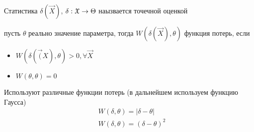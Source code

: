 \documentclass[main.tex]{subfiles}
\begin{document}
\begin{definition}
	Статистика $\delta ( \vec{X} )$, $\delta : \mathfrak{X} \rightarrow \Theta$ наызвается точечной оценкой
\end{definition}

\begin{definition}
	пусть $\theta$ реально значение параметра, тогда $W(\delta (\vec{X}),\theta)$ функция потерь, если
	\begin{itemize}
	 	\item $W(\delta (\vec(X),\theta)>0,\forall \vec{X}$
	 	\item $W(\theta,\theta)=0$
	 \end{itemize} 
\end{definition}
Используют различные функции потерь (в дальнейшем используем функцию Гаусса)
\begin{align}
	& W(\delta,\theta)=|\delta-\theta| \tag{Лаплас} \\
	& W(\delta,\theta)=(\delta-\theta)^2 \tag{Гаусс}
\end{align}
\end{document}
